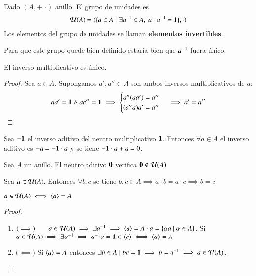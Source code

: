 \begin{dfn}
	Dado $(A, +, \cdot)$ anillo. El grupo de unidades es
	\begin{align}
		\mathcal{U}(A) = (\{a \in A \mid \exists a^{-1} \in A,\ a\cdot a^{-1} = \mathbf{1}\}, \cdot)
	\end{align}
	Los elementos del grupo de unidades se llaman \textbf{elementos invertibles}.
\end{dfn}

Para que este grupo quede bien definido estaría bien que $a^{-1}$ fuera único.

\begin{pro}
	El inverso multiplicativo es único.
\end{pro}

\begin{proof}
	Sea $a \in A$. Supongamos $a', a'' \in A$ son ambos inversos multiplicativos de $a$:
	\begin{align*}
		aa' = \mathbf{1} \land aa'' = \mathbf{1}\implies \begin{cases}
		a''(aa') = a'' \\
		(a''a)a' = a''
		\end{cases}\implies a' = a''
	\end{align*}
\end{proof}

\begin{pro}
	Sea $-\mathbf{1}$ el inverso aditivo del neutro multiplicativo $\mathbf{1}$. Entonces $\forall a \in A$ el inverso aditivo es $-a = -\mathbf{1} \cdot a$ y se tiene $-\mathbf{1}\cdot a + a = 0$.
\end{pro}

\begin{pro}
	Sea $A$ un anillo. El neutro aditivo $\mathbf{0}$ verifica $\mathbf{0} \not\in \mathcal{U}(A)$
\end{pro}

\begin{pro}
	Sea $a \in \mathcal{U}(A)$. Entonces $\forall b,c$ se tiene $b, c \in A \implies a\cdot b = a\cdot c \implies b = c$
\end{pro}

\begin{pro}
	$a \in \mathcal{U}(A) \iff \langle a\rangle = A$
\end{pro}

\begin{proof}$ $\newline
	\begin{enumerate}
		\item $(\implies)\qquad a \in \mathcal{U}(A) \implies \exists a^{-1} \implies \langle a\rangle = A\cdot a = \{\alpha a \mid \alpha \in A\}$. Si $a \in \mathcal{U}(A) \implies \exists a^{-1} \implies a^{-1}a = \mathbf{1} \in \langle a\rangle \iff \langle a\rangle = A$
		
		\item $(\impliedby$) Si $\langle a\rangle = A$ entonces $\exists b \in A \mid ba = \mathbf{1} \implies b = a^{-1} \implies a \in \mathcal{U}(A)$.
	\end{enumerate}
\end{proof}

